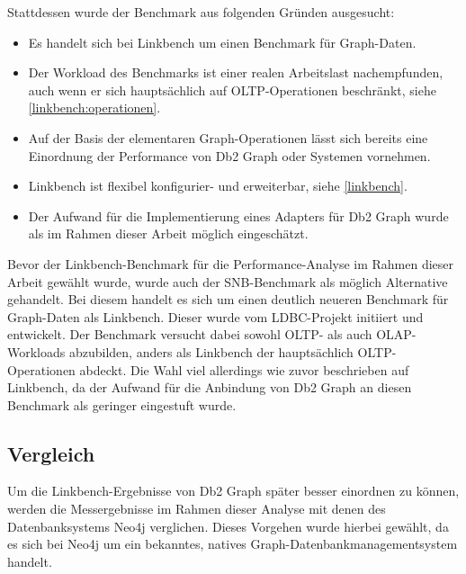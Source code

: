 Stattdessen wurde der Benchmark aus folgenden Gründen ausgesucht:
\begin{itemize}
    \item Es handelt sich bei Linkbench um einen Benchmark für Graph-Daten.
    \item Der Workload des Benchmarks ist einer realen Arbeitslast nachempfunden, auch wenn er sich hauptsächlich auf OLTP-Operationen beschränkt, siehe \autoref{linkbench:operationen}. 
    \item Auf der Basis der elementaren Graph-Operationen lässt sich bereits eine Einordnung der Performance von Db2 Graph oder Systemen vornehmen. 
    \item Linkbench ist flexibel konfigurier- und erweiterbar, siehe \autoref{linkbench}. 
    \item Der Aufwand für die Implementierung eines Adapters für Db2 Graph wurde als im Rahmen dieser Arbeit möglich eingeschätzt.
\end{itemize}
Bevor der Linkbench-Benchmark für die Performance-Analyse im Rahmen dieser Arbeit gewählt wurde, wurde auch der SNB-Benchmark als möglich Alternative gehandelt. Bei diesem  handelt es sich um einen deutlich neueren Benchmark für Graph-Daten als Linkbench. Dieser wurde vom LDBC-Projekt initiiert und entwickelt. Der Benchmark versucht dabei sowohl OLTP- als auch OLAP-Workloads abzubilden, anders als Linkbench der hauptsächlich OLTP-Operationen abdeckt. Die Wahl viel allerdings wie zuvor beschrieben auf Linkbench, da der Aufwand für die Anbindung von Db2 Graph an diesen Benchmark als geringer eingestuft wurde.  

\subsection{Vergleich}
Um die Linkbench-Ergebnisse von Db2 Graph später besser einordnen zu können, werden die Messergebnisse im Rahmen dieser Analyse mit denen des Datenbanksystems Neo4j verglichen. Dieses Vorgehen wurde hierbei gewählt, da es sich bei Neo4j um ein bekanntes, natives Graph-Datenbankmanagementsystem handelt.


